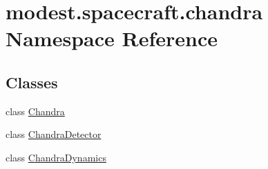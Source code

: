 \hypertarget{namespacemodest_1_1spacecraft_1_1chandra}{}\section{modest.\+spacecraft.\+chandra Namespace Reference}
\label{namespacemodest_1_1spacecraft_1_1chandra}
\subsection*{Classes}
\begin{DoxyCompactItemize}
\item 
class \hyperlink{classmodest_1_1spacecraft_1_1chandra_1_1Chandra}{Chandra}
\item 
class \hyperlink{classmodest_1_1spacecraft_1_1chandra_1_1ChandraDetector}{Chandra\+Detector}
\item 
class \hyperlink{classmodest_1_1spacecraft_1_1chandra_1_1ChandraDynamics}{Chandra\+Dynamics}
\end{DoxyCompactItemize}
